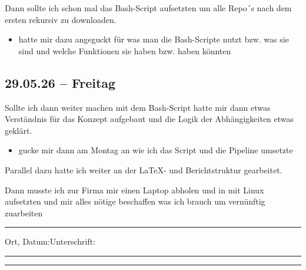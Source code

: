 Dann sollte ich schon mal das Bash-Script aufsetzten um alle Repo´s nach dem ersten rekursiv zu downloaden.

\begin{itemize}
  \item hatte mir dazu angeguckt für was man die Bash-Scripte nutzt bzw. was sie sind und welche Funktionen sie haben bzw. haben könnten
\end{itemize}
  
\subsection{29.05.26 -- Freitag}

Sollte ich dann weiter machen mit dem Bash-Script hatte mir dann etwas Verständnis für das Konzept aufgebaut und die Logik der Abhängigkeiten etwas geklärt.

\begin{itemize}
    \item gucke mir dann am Montag an wie ich das Script und die Pipeline umsetzte
\end{itemize}

Parallel dazu hatte ich weiter an der LaTeX- und Berichtstruktur gearbeitet.

Dann musste ich zur Firma mir einen Laptop abholen und in mit Linux aufsetzten und mir alles nötige beschaffen was ich brauch um vernünftig zuarbeiten

\vfill
\noindent\rule{\linewidth}{0.2pt}

\noindent Ort, Datum:\hfill Unterschrift:\\[0.5cm]
\noindent \rule{6cm}{0.9pt}\hfill \rule{6cm}{0.9pt}
\newpage


\vspace*{-2cm}

